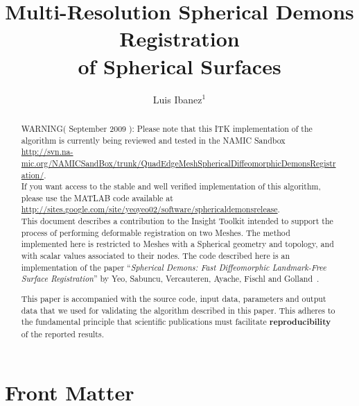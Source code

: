 \documentclass{InsightArticle}
\title{Multi-Resolution Spherical Demons Registration\\ of Spherical Surfaces}
\author{Luis Ibanez$^{1}$}
\newcommand{\IJhandlerIDnumber}{3117}
\begin{document}
%
% 
\IJhandlefooter{\IJhandlerIDnumber}


\ifpdf
\else
\fi


\maketitle


\ifhtml
\chapter*{Front Matter\label{front}}
\fi


\begin{abstract}
\noindent
WARNING( September 2009 ): Please note that this ITK implementation of the algorithm is
currently being reviewed and tested in the NAMIC Sandbox\\
\url{http://svn.na-mic.org/NAMICSandBox/trunk/QuadEdgeMeshSphericalDiffeomorphicDemonsRegistration/}.\\


If you want access to the stable and well verified implementation of this
algorithm, please use the MATLAB code available at\\
\url{http://sites.google.com/site/yeoyeo02/software/sphericaldemonsrelease}.\\


This document describes a contribution to the Insight Toolkit intended to
support the process of performing deformable registration on two Meshes. The
method implemented here is restricted to Meshes with a Spherical geometry and
topology, and with scalar values associated to their nodes. The code described
here is an implementation of the paper ``\emph{Spherical Demons: Fast
Diffeomorphic Landmark-Free Surface Registration}'' by Yeo, Sabuncu,
Vercauteren, Ayache, Fischl and Golland~\cite{Yeo2008,Yeo2009}.

This paper is accompanied with the source code, input data, parameters and
output data that we used for validating the algorithm described in this paper.
This adheres to the fundamental principle that scientific publications must
facilitate \textbf{reproducibility} of the reported results.
\end{abstract}
\end{document}
